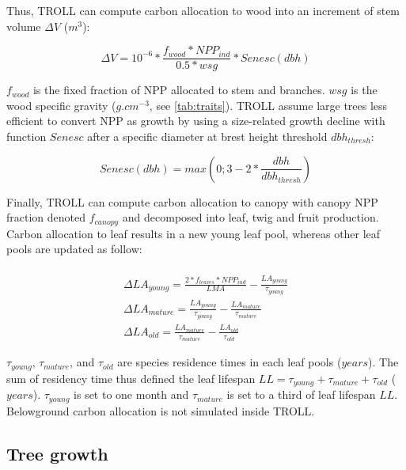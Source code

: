 \documentclass[12pt,]{article}
\theoremstyle{definition}
\theoremstyle{definition}
\theoremstyle{remark}
\begin{document}
Thus, TROLL can compute carbon allocation to wood into an increment of
stem volume \(\Delta V\) (\(m^3\)):

\begin{equation}
  \Delta V = 10^{-6} * \frac{f_{wood}*NPP_{ind}}{0.5*wsg}*Senesc(dbh)
  \label{eq:DeltaV}
\end{equation}

\(f_{wood}\) is the fixed fraction of NPP allocated to stem and
branches. \(wsg\) is the wood specific gravity (\(g.cm^{-3}\), see
\ref{tab:traits}). TROLL assume large trees less efficient to convert
NPP as growth by using a size-related growth decline with function
\(Senesc\) after a specific diameter at brest height threshold
\(dbh_{thresh}\):

\begin{equation}
  Senesc(dbh) = max(0;3-2*\frac{dbh}{dbh_{thresh}})
  \label{eq:Senesc}
\end{equation}

Finally, TROLL can compute carbon allocation to canopy with canopy NPP
fraction denoted \(f_{canopy}\) and decomposed into leaf, twig and fruit
production. Carbon allocation to leaf results in a new young leaf pool,
whereas other leaf pools are updated as follow:

\begin{equation}
  \begin{array}{c} \\
   \Delta LA_{young} = \frac{2*f_{leaves}*NPP_{ind}}{LMA}-\frac{LA_{young}}{\tau_{young}} \\
  \Delta LA_{mature} = \frac{LA_{young}}{\tau_{young}} - \frac{LA_{mature}}{\tau_{mature}}\\
  \Delta LA_{old} = \frac{LA_{mature}}{\tau_{mature}} - \frac{LA_{old}}{\tau_{old}}
  \end{array}
  \label{eq:DeltaLA}
\end{equation}

\(\tau_{young}\), \(\tau_{mature}\), and \(\tau_{old}\) are species
residence times in each leaf pools (\(years\)). The sum of residency
time thus defined the leaf lifespan
\(LL = \tau_{young} + \tau_{mature} + \tau_{old}\) (\(years\)).
\(\tau_{young}\) is set to one month and \(\tau_{mature}\) is set to a
third of leaf lifespan \(LL\). Belowground carbon allocation is not
simulated inside TROLL.

\subsection{Tree growth}\label{tree-growth}
\end{document}
